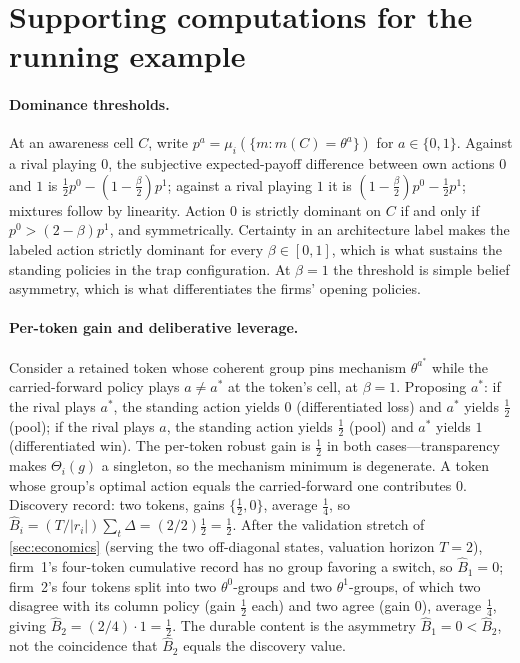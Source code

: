 \documentclass[11pt]{article}
\theoremstyle{definition}
\begin{document}
\section{Supporting computations for the running example}
\label{app:example}

\paragraph{Dominance thresholds.}
At an awareness cell $C$, write $p^a=\mu_i(\{m:m(C)=\theta^a\})$ for $a\in\{0,1\}$.
Against a rival playing $0$, the subjective expected-payoff difference between own actions $0$ and $1$ is $\tfrac12p^0-(1-\tfrac{\beta}{2})p^1$; against a rival playing $1$ it is $(1-\tfrac{\beta}{2})p^0-\tfrac12p^1$; mixtures follow by linearity.
Action $0$ is strictly dominant on $C$ if and only if $p^0>(2-\beta)p^1$, and symmetrically.
Certainty in an architecture label makes the labeled action strictly dominant for every $\beta\in[0,1]$, which is what sustains the standing policies in the trap configuration.
At $\beta=1$ the threshold is simple belief asymmetry, which is what differentiates the firms' opening policies.

\paragraph{Per-token gain and deliberative leverage.}
Consider a retained token whose coherent group pins mechanism $\theta^{a^{*}}$ while the carried-forward policy plays $a\neq a^{*}$ at the token's cell, at $\beta=1$.
Proposing $a^{*}$: if the rival plays $a^{*}$, the standing action yields $0$ (differentiated loss) and $a^{*}$ yields $\tfrac12$ (pool); if the rival plays $a$, the standing action yields $\tfrac12$ (pool) and $a^{*}$ yields $1$ (differentiated win).
The per-token robust gain is $\tfrac12$ in both cases---transparency makes $\Theta_i(g)$ a singleton, so the mechanism minimum is degenerate.
A token whose group's optimal action equals the carried-forward one contributes $0$.
Discovery record: two tokens, gains $\{\tfrac12,0\}$, average $\tfrac14$, so $\widehat B_i=(T/\lvert r_i\rvert)\sum_t\Delta=(2/2)\tfrac12=\tfrac12$.
After the validation stretch of \cref{sec:economics} (serving the two off-diagonal states, valuation horizon $T=2$), firm~1's four-token cumulative record has no group favoring a switch, so $\widehat B_1=0$; firm~2's four tokens split into two $\theta^0$-groups and two $\theta^1$-groups, of which two disagree with its column policy (gain $\tfrac12$ each) and two agree (gain $0$), average $\tfrac14$, giving $\widehat B_2=(2/4)\cdot 1=\tfrac12$.
The durable content is the asymmetry $\widehat B_1=0<\widehat B_2$, not the coincidence that $\widehat B_2$ equals the discovery value.
\end{document}
